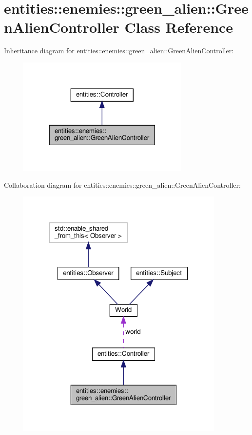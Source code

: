 \hypertarget{classentities_1_1enemies_1_1green__alien_1_1GreenAlienController}{}\section{entities\+:\+:enemies\+:\+:green\+\_\+alien\+:\+:Green\+Alien\+Controller Class Reference}
\label{classentities_1_1enemies_1_1green__alien_1_1GreenAlienController}


Inheritance diagram for entities\+:\+:enemies\+:\+:green\+\_\+alien\+:\+:Green\+Alien\+Controller\+:\nopagebreak
\begin{figure}[H]
\begin{center}
\leavevmode
\includegraphics[width=242pt]{classentities_1_1enemies_1_1green__alien_1_1GreenAlienController__inherit__graph}
\end{center}
\end{figure}


Collaboration diagram for entities\+:\+:enemies\+:\+:green\+\_\+alien\+:\+:Green\+Alien\+Controller\+:\nopagebreak
\begin{figure}[H]
\begin{center}
\leavevmode
\includegraphics[width=293pt]{classentities_1_1enemies_1_1green__alien_1_1GreenAlienController__coll__graph}
\end{center}
\end{figure}
